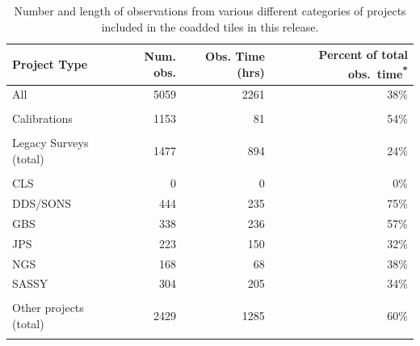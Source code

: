 \documentclass[usenatbib]{mnras}
\begin{document}
\begin{table}
  \caption{Number and length of observations from various different
    categories of projects included in the coadded tiles in this
    release. \label{tab:obsnum}}
  {\centering
    \begin{tabular}{l r r r}
      \hline
      Project Type &
      \multicolumn{1}{p{0.7cm}}{Num. obs.} &
      \multicolumn{1}{p{0.7cm}}{Obs. Time \newline(hrs)} &
      \multicolumn{1}{p{2.0cm}}{%
      Percent of total obs.\ time\textsuperscript{*}}\\

      \hline

      All                      & 5059 & 2261 & 38\%   \\\\
      Calibrations             & 1153 &   81 & 54\%   \\\\
      Legacy Surveys (total)   & 1477 &  894 & 24\%   \\\\

      \hspace{0.5cm} CLS       &   0  &    0 &  0\%   \\
      \hspace{0.5cm} DDS/SONS  & 444  &  235 & 75\%   \\
      \hspace{0.5cm} GBS       & 338  &  236 & 57\%   \\
      \hspace{0.5cm} JPS       & 223  &  150 & 32\%   \\
      \hspace{0.5cm} NGS       & 168  &   68 & 38\%   \\
      \hspace{0.5cm} SASSY     & 304  &  205 & 34\%   \\\\

      Other projects  (total)  & 2429 & 1285 & 60\%   \\\\


\end{tabular}}
\end{table}
\end{document}
